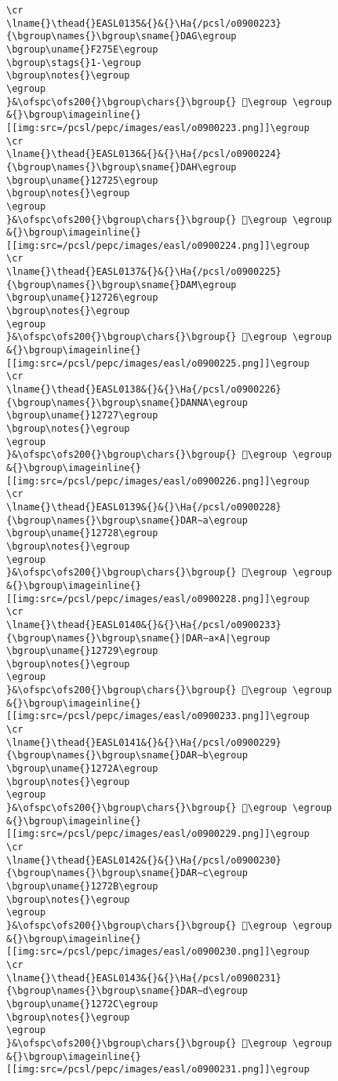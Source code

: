 \begin{verbatim}
\cr
\lname{}\thead{}EASL0135&{}&{}\Ha{/pcsl/o0900223}{\bgroup\names{}\bgroup\sname{}DAG\egroup
\bgroup\uname{}F275E\egroup
\bgroup\stags{}1-\egroup
\bgroup\notes{}\egroup
\egroup
}&\ofspc\ofs200{}\bgroup\chars{}\bgroup{} 󲝞\egroup \egroup
&{}\bgroup\imageinline{}[[img:src=/pcsl/pepc/images/easl/o0900223.png]]\egroup
\cr
\lname{}\thead{}EASL0136&{}&{}\Ha{/pcsl/o0900224}{\bgroup\names{}\bgroup\sname{}DAH\egroup
\bgroup\uname{}12725\egroup
\bgroup\notes{}\egroup
\egroup
}&\ofspc\ofs200{}\bgroup\chars{}\bgroup{} 𒜥\egroup \egroup
&{}\bgroup\imageinline{}[[img:src=/pcsl/pepc/images/easl/o0900224.png]]\egroup
\cr
\lname{}\thead{}EASL0137&{}&{}\Ha{/pcsl/o0900225}{\bgroup\names{}\bgroup\sname{}DAM\egroup
\bgroup\uname{}12726\egroup
\bgroup\notes{}\egroup
\egroup
}&\ofspc\ofs200{}\bgroup\chars{}\bgroup{} 𒜦\egroup \egroup
&{}\bgroup\imageinline{}[[img:src=/pcsl/pepc/images/easl/o0900225.png]]\egroup
\cr
\lname{}\thead{}EASL0138&{}&{}\Ha{/pcsl/o0900226}{\bgroup\names{}\bgroup\sname{}DANNA\egroup
\bgroup\uname{}12727\egroup
\bgroup\notes{}\egroup
\egroup
}&\ofspc\ofs200{}\bgroup\chars{}\bgroup{} 𒜧\egroup \egroup
&{}\bgroup\imageinline{}[[img:src=/pcsl/pepc/images/easl/o0900226.png]]\egroup
\cr
\lname{}\thead{}EASL0139&{}&{}\Ha{/pcsl/o0900228}{\bgroup\names{}\bgroup\sname{}DAR∼a\egroup
\bgroup\uname{}12728\egroup
\bgroup\notes{}\egroup
\egroup
}&\ofspc\ofs200{}\bgroup\chars{}\bgroup{} 𒜨\egroup \egroup
&{}\bgroup\imageinline{}[[img:src=/pcsl/pepc/images/easl/o0900228.png]]\egroup
\cr
\lname{}\thead{}EASL0140&{}&{}\Ha{/pcsl/o0900233}{\bgroup\names{}\bgroup\sname{}|DAR∼a×A|\egroup
\bgroup\uname{}12729\egroup
\bgroup\notes{}\egroup
\egroup
}&\ofspc\ofs200{}\bgroup\chars{}\bgroup{} 𒜩\egroup \egroup
&{}\bgroup\imageinline{}[[img:src=/pcsl/pepc/images/easl/o0900233.png]]\egroup
\cr
\lname{}\thead{}EASL0141&{}&{}\Ha{/pcsl/o0900229}{\bgroup\names{}\bgroup\sname{}DAR∼b\egroup
\bgroup\uname{}1272A\egroup
\bgroup\notes{}\egroup
\egroup
}&\ofspc\ofs200{}\bgroup\chars{}\bgroup{} 𒜪\egroup \egroup
&{}\bgroup\imageinline{}[[img:src=/pcsl/pepc/images/easl/o0900229.png]]\egroup
\cr
\lname{}\thead{}EASL0142&{}&{}\Ha{/pcsl/o0900230}{\bgroup\names{}\bgroup\sname{}DAR∼c\egroup
\bgroup\uname{}1272B\egroup
\bgroup\notes{}\egroup
\egroup
}&\ofspc\ofs200{}\bgroup\chars{}\bgroup{} 𒜫\egroup \egroup
&{}\bgroup\imageinline{}[[img:src=/pcsl/pepc/images/easl/o0900230.png]]\egroup
\cr
\lname{}\thead{}EASL0143&{}&{}\Ha{/pcsl/o0900231}{\bgroup\names{}\bgroup\sname{}DAR∼d\egroup
\bgroup\uname{}1272C\egroup
\bgroup\notes{}\egroup
\egroup
}&\ofspc\ofs200{}\bgroup\chars{}\bgroup{} 𒜬\egroup \egroup
&{}\bgroup\imageinline{}[[img:src=/pcsl/pepc/images/easl/o0900231.png]]\egroup

\end{verbatim}
